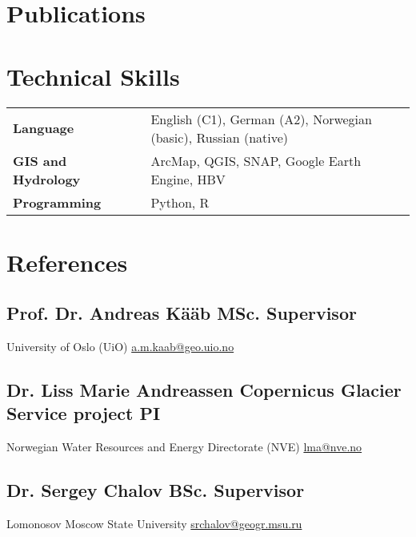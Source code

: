 \documentclass[a4,10pt]{article}
\newcommand{\hskills}[1]{
\textbf{\bfseries #1} }
\begin{document}
\section{Publications} 
\renewcommand\refname{\vskip -1.5em}
\nocite{*}
\printbibliography[heading=none]
\vspace{-0.4cm}


\section{Technical Skills}
\begin{tabular}{p{11em} p{1em} p{43em}}
\hskills{Language} &  &  English (C1), German (A2), Norwegian (basic), Russian (native) \\
\hskills{GIS and Hydrology} &  & ArcMap, QGIS, SNAP, Google Earth Engine, HBV  \\
\hskills{Programming} &  & Python, R \\
\end{tabular}
\vspace{-0.2cm}




\section{References} 

\subsection*{Prof. Dr. Andreas Kääb  \hfill MSc. Supervisor} 
University of Oslo (UiO) \hfill \href{a.m.kaab@geo.uio.no}{a.m.kaab@geo.uio.no} 
\vspace{0.1cm}

\subsection*{Dr. Liss Marie Andreassen \hfill Copernicus Glacier Service project PI}
Norwegian Water Resources and Energy Directorate (NVE) \hfill \href{lma@nve.no}{lma@nve.no}

\vspace{0.1cm}
\subsection*{Dr. Sergey Chalov \hfill BSc. Supervisor}
Lomonosov Moscow State University \hfill \href{srchalov@geogr.msu.ru}{srchalov@geogr.msu.ru}


\end{document}
